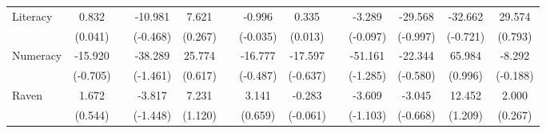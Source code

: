 \begin{table}[htbp]
{\begin{tabular}{lcccccccccccc}
    Literacy & 0.832 &   & -10.981 & 7.621 &   & -0.996 & 0.335 &   & -3.289 & -29.568 & -32.662 & 29.574 \\
      & (0.041) &   & (-0.468) & (0.267) &   & (-0.035) & (0.013) &   & (-0.097) & (-0.997) & (-0.721) & (0.793) \\
    Numeracy & -15.920 &   & -38.289 & 25.774 &   & -16.777 & -17.597 &   & -51.161 & -22.344 & 65.984 & -8.292 \\
      & (-0.705) &   & (-1.461) & (0.617) &   & (-0.487) & (-0.637) &   & (-1.285) & (-0.580) & (0.996) & (-0.188) \\
    Raven & 1.672 &   & -3.817 & 7.231 &   & 3.141 & -0.283 &   & -3.609 & -3.045 & 12.452 & 2.000 \\
      & (0.544) &   & (-1.448) & (1.120) &   & (0.659) & (-0.061) &   & (-1.103) & (-0.668) & (1.209) & (0.267) \\


\end{tabular}}
\end{table}
